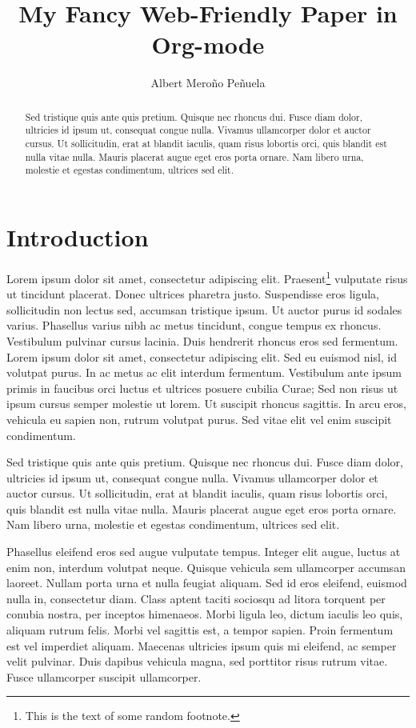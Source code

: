 \documentclass{llncs}
\title{My Fancy Web-Friendly Paper in Org-mode}
\author{Albert Meroño Peñuela}
\date{}
\begin{document}
\maketitle


\begin{abstract}
Sed tristique quis ante quis pretium. Quisque nec rhoncus dui. Fusce
diam dolor, ultricies id ipsum ut, consequat congue nulla. Vivamus
ullamcorper dolor et auctor cursus. Ut sollicitudin, erat at blandit
iaculis, quam risus lobortis orci, quis blandit est nulla vitae
nulla. Mauris placerat augue eget eros porta ornare. Nam libero urna,
molestie et egestas condimentum, ultrices sed elit.
\end{abstract}

\section{Introduction}
\label{sec-1}


Lorem ipsum dolor sit amet, consectetur adipiscing elit. Praesent\footnote{This is the text of some random footnote.
 }
vulputate risus ut tincidunt placerat. Donec ultrices pharetra
justo. Suspendisse eros ligula, sollicitudin non lectus sed, accumsan
tristique ipsum. Ut auctor purus id sodales varius. Phasellus varius
nibh ac metus tincidunt, congue tempus ex rhoncus. Vestibulum pulvinar
cursus lacinia. Duis hendrerit rhoncus eros sed fermentum. Lorem ipsum
dolor sit amet, consectetur adipiscing elit. Sed eu euismod nisl, id
volutpat purus. In ac metus ac elit interdum fermentum. Vestibulum
ante ipsum primis in faucibus orci luctus et ultrices posuere cubilia
Curae; Sed non risus ut ipsum cursus semper molestie ut lorem. Ut
suscipit rhoncus sagittis. In arcu eros, vehicula eu sapien non,
rutrum volutpat purus. Sed vitae elit vel enim suscipit condimentum.

Sed tristique quis ante quis pretium. Quisque nec rhoncus dui. Fusce
diam dolor, ultricies id ipsum ut, consequat congue nulla. Vivamus
ullamcorper dolor et auctor cursus. Ut sollicitudin, erat at blandit
iaculis, quam risus lobortis orci, quis blandit est nulla vitae
nulla. Mauris placerat augue eget eros porta ornare. Nam libero urna,
molestie et egestas condimentum, ultrices sed elit.

Phasellus eleifend eros sed augue vulputate tempus. Integer elit
augue, luctus at enim non, interdum volutpat neque. Quisque vehicula
sem ullamcorper accumsan laoreet. Nullam porta urna et nulla feugiat
aliquam. Sed id eros eleifend, euismod nulla in, consectetur
diam. Class aptent taciti sociosqu ad litora torquent per conubia
nostra, per inceptos himenaeos. Morbi ligula leo, dictum iaculis leo
quis, aliquam rutrum felis. Morbi vel sagittis est, a tempor
sapien. Proin fermentum est vel imperdiet aliquam. Maecenas ultricies
ipsum quis mi eleifend, ac semper velit pulvinar. Duis dapibus
vehicula magna, sed porttitor risus rutrum vitae. Fusce ullamcorper
suscipit ullamcorper.
\end{document}
